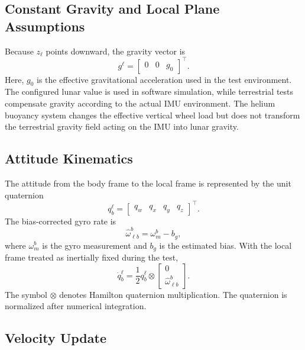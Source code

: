 \documentclass[]{IAC_style}
\begin{document}
\subsection{Constant Gravity and Local Plane Assumptions}

Because $z_\ell$ points downward, the gravity vector is
\begin{equation}
\tag{1}\label{eq:1}
g^\ell=\begin{bmatrix}0&0&g_0\end{bmatrix}^{\top}.
\end{equation}
Here, $g_0$ is the effective gravitational acceleration used in the test environment. The configured lunar value is used in software simulation, while terrestrial tests compensate gravity according to the actual IMU environment. The helium buoyancy system changes the effective vertical wheel load but does not transform the terrestrial gravity field acting on the IMU into lunar gravity.

\subsection{Attitude Kinematics}

The attitude from the body frame to the local frame is represented by the unit quaternion
\begin{equation*}
q_b^\ell=\begin{bmatrix}q_w&q_x&q_y&q_z\end{bmatrix}^{\top}.
\end{equation*}
The bias-corrected gyro rate is
\begin{equation}
\tag{2}\label{eq:2}
\hat{\omega}_{\ell b}^b=\omega_m^b-b_g,
\end{equation}
where $\omega_m^b$ is the gyro measurement and $b_g$ is the estimated bias. With the local frame treated as inertially fixed during the test,
\begin{equation}
\tag{3}\label{eq:3}
\dot q_b^\ell=\frac{1}{2}q_b^\ell\otimes\begin{bmatrix}0\\\hat{\omega}_{\ell b}^b\end{bmatrix}.
\end{equation}
The symbol $\otimes$ denotes Hamilton quaternion multiplication. The quaternion is normalized after numerical integration.

\subsection{Velocity Update}
\end{document}
